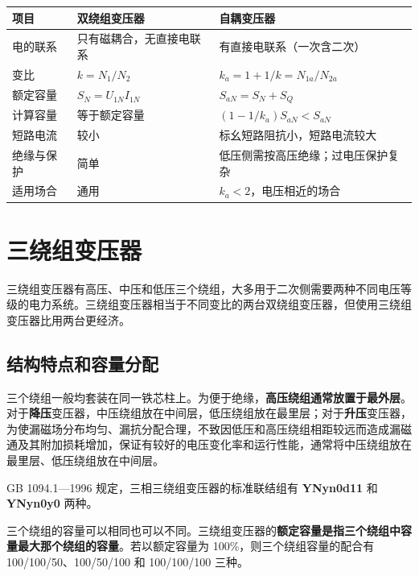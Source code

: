 \begin{center}
\begin{tabular}{@{}p{2.6cm}p{5.0cm}p{5.0cm}@{}}
\toprule
项目 & 双绕组变压器 & 自耦变压器 \\
\midrule
电的联系 & 只有磁耦合，无直接电联系 & 有直接电联系（一次含二次） \\
变比 & $k=N_1/N_2$ & $k_a=1+1/k=N_{1a}/N_{2a}$ \\
额定容量 & $S_N=U_{1N}I_{1N}$ & $S_{aN}=S_N+S_Q$ \\
计算容量 & 等于额定容量 & $(1-1/k_a)S_{aN}<S_{aN}$ \\
短路电流 & 较小 & 标幺短路阻抗小，短路电流较大 \\
绝缘与保护 & 简单 & 低压侧需按高压绝缘；过电压保护复杂 \\
适用场合 & 通用 & $k_a<2$，电压相近的场合 \\
\bottomrule
\end{tabular}
\end{center}


\section{三绕组变压器}

三绕组变压器有高压、中压和低压三个绕组，大多用于二次侧需要两种不同电压等级的电力系统。三绕组变压器相当于不同变比的两台双绕组变压器，但使用三绕组变压器比用两台更经济。

\subsection{结构特点和容量分配}
三个绕组一般均套装在同一铁芯柱上。为便于绝缘，\textbf{高压绕组通常放置于最外层}。对于\textbf{降压}变压器，中压绕组放在中间层，低压绕组放在最里层；对于\textbf{升压}变压器，为使漏磁场分布均匀、漏抗分配合理，不致因低压和高压绕组相距较远而造成漏磁通及其附加损耗增加，保证有较好的电压变化率和运行性能，通常将中压绕组放在最里层、低压绕组放在中间层。

GB 1094.1—1996 规定，三相三绕组变压器的标准联结组有 \textbf{YNyn0d11} 和 \textbf{YNyn0y0} 两种。

三个绕组的容量可以相同也可以不同。三绕组变压器的\textbf{额定容量是指三个绕组中容量最大那个绕组的容量}。若以额定容量为 100\%，则三个绕组容量的配合有 100/100/50、100/50/100 和 100/100/100 三种。

